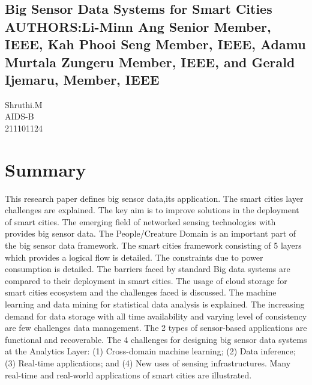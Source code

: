 \documentclass{report}
\begin{document}
    
    \begin{center}
        \section*{Big Sensor Data Systems for Smart Cities\\AUTHORS:Li-Minn Ang Senior Member, IEEE, Kah Phooi Seng Member, IEEE, Adamu Murtala Zungeru
Member, IEEE, and Gerald Ijemaru, Member, IEEE}
    
    \setlength{\columnsep}{1.0cm}
   
    Shruthi.M\\
    AIDS-B\\
    211101124
    \end{center}
    \begin{center}
        \section*{}
    \end{center}
    
\setlength{\columnsep}{1.0cm}
    \large
    \section{Summary}
   
    
    This research paper defines big sensor data,its application. The smart cities layer challenges are explained. The key aim is to improve solutions in the deployment of smart cities. The emerging field of networked sensing technologies with provides big sensor data. The People/Creature Domain is an important part of the big sensor data framework. The smart cities framework consisting of 5 layers which provides a logical flow is detailed. The constraints due to power consumption is detailed. The barriers faced by standard Big data systems are compared to their deployment in smart cities. The usage of cloud storage for smart cities ecosystem and the challenges faced is discussed. The machine learning and data mining for statistical data analysis is explained. The increasing demand for data storage with all time availability and varying level of consistency are few challenges data management. The 2 types of sensor-based applications are functional and recoverable. The 4 challenges for designing big sensor data systems at the Analytics Layer: (1) Cross-domain machine learning; (2) Data inference; (3) Real-time applications; and (4) New uses of sensing infrastructures. Many real-time and real-world applications of smart cities are illustrated.
    
\end{document}
